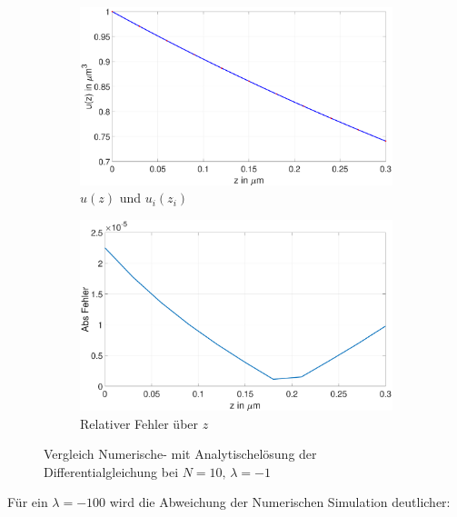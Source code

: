   \begin{figure}[p]
 	\begin{subfigure}[b]{0.5\textwidth}
 		\includegraphics[width=\textwidth]{figures/station_gl_2_1/test_n10}
 		\caption{$u(z)$ und $u_{i}(z_i)$}
 	\end{subfigure}
 	\hfill
 	\begin{subfigure}[b]{0.5\textwidth}
 		\includegraphics[width=1\linewidth]{figures/station_gl_2_1/test_n10_fehler}
 		\caption{Relativer Fehler über $z$}
 	\end{subfigure}
 	\caption{Vergleich  Numerische- mit Analytischelösung der Differentialgleichung bei $N=10,\,\lambda=-1$}
 \end{figure}
\clearpage
 Für ein $\lambda=-100$ wird die Abweichung der Numerischen Simulation deutlicher:
  
